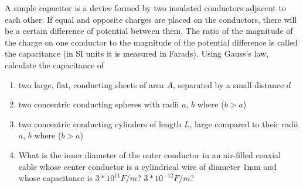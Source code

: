 \begin{question}

  A simple capacitor is a device formed by two insulated conductors
  adjacent to each other. If equal and opposite charges are placed on
  the conductors, there will be a certain difference of potential
  between them. The ratio of the magnitude of the charge on one
  conductor to the magnitude of the potential difference is called the
  capacitance (in SI units it is measured in Farads). Using Gauss's
  law, calculate the capacitance of

  \begin{enumerate}[label=\alph*]

  \item two large, flat, conducting sheets of area $A$, separated by a
    small distance $d$

  \item two concentric conducting spheres with radii $a$, $b$ where
    ($b > a$)

  \item two concentric conducting cylinders of length $L$, large
    compared to their radii $a$, $b$ where ($b > a$)

  \item What is the inner diameter of the outer conductor in an
    air-filled coaxial cable whose center conductor is a cylindrical
    wire of diameter 1mm and whose capacitance is $3 * 10^{11} F/m$?
    $3 * 10^{-12} F/m$?

  \end{enumerate}

\end{question}



